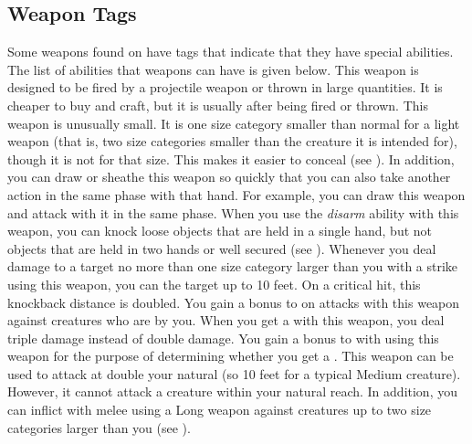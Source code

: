     \subsection{Weapon Tags}\label{Weapon Tags}
        Some weapons found on  have tags that indicate that they have special abilities. The list of abilities that weapons can have is given below.
         This weapon is designed to be fired by a projectile weapon or thrown in large quantities.
        It is cheaper to buy and craft, but it is usually  after being fired or thrown.
         This weapon is unusually small.
        It is one size category smaller than normal for a light weapon (that is, two size categories smaller than the creature it is intended for), though it is not  for that size.
        This makes it easier to conceal (see ).
        In addition, you can draw or sheathe this weapon so quickly that you can also take another action in the same phase with that hand.
        For example, you can draw this weapon and attack with it in the same phase.
         When you use the \textit{disarm} ability with this weapon, you can knock loose objects that are held in a single hand, but not objects that are held in two hands or well secured (see ).
         Whenever you deal damage to a target no more than one size category larger than you with a strike using this weapon, you can  the target up to 10 feet.
        On a critical hit, this knockback distance is doubled.
         You gain a  bonus to  on  attacks with this weapon against creatures who are \grappled by you.
         When you get a  with this weapon, you deal triple damage instead of double damage.
         You gain a  bonus to  with  using this weapon for the purpose of determining whether you get a .
        \label{Long Weapon} This weapon can be used to attack at double your natural  (so 10 feet for a typical Medium creature).
        However, it cannot attack a creature within your natural reach.
        In addition, you can inflict  with melee  using a Long weapon against creatures up to two size categories larger than you (see ).

